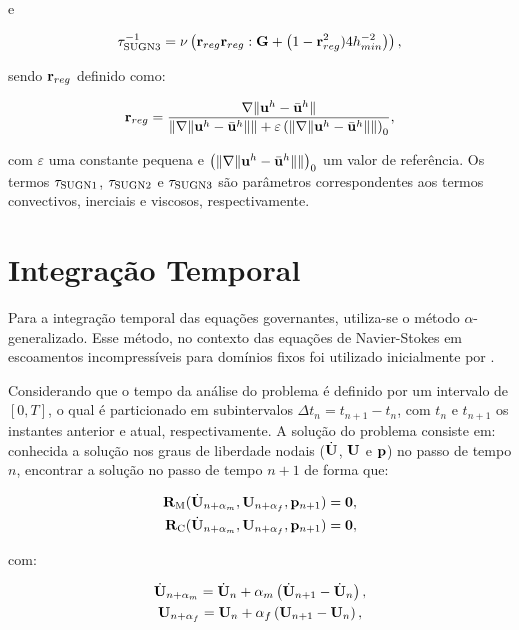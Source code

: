 \documentclass[tese_patricia]{subfiles}%
\begin{document}
\noindent e

\begin{align}
\tau_{\mathrm{SUGN3}}^{-1} = \nu \left(\mathbf{r}_{reg}\mathbf{r}_{reg} : \mathbf{G} + \left(1 - \mathbf{r}_{reg}^2)4h_{min}^{-2} \right)\right) ,
\end{align}

\noindent sendo $\mathbf{r}_{reg}$ definido como:

\begin{align}
\mathbf{r}_{reg} =\frac{\nabla \lVert\mathbf{u}^h - \bar{\mathbf{u}}^h\rVert}{\lVert \nabla \lVert\mathbf{u}^h - \bar{\mathbf{u}}^h\rVert\rVert + \varepsilon\left(\lVert \nabla \lVert\mathbf{u}^h - \bar{\mathbf{u}}^h\rVert\rVert\right)_0},
\end{align}

\noindent com $\varepsilon$ uma constante pequena e $\left(\lVert \nabla \lVert\mathbf{u}^h- \bar{\mathbf{u}}^h\rVert\rVert\right)_0$ um valor de referência. Os termos $\tau_{\mathrm{SUGN1}}$, $\tau_{\mathrm{SUGN2}}$ e $\tau_{\mathrm{SUGN3}}$ são parâmetros correspondentes aos termos convectivos, inerciais e viscosos, respectivamente.


\section{Integração Temporal}

Para a integração temporal das equações governantes, utiliza-se o método $\alpha$-generalizado. Esse método, no contexto das equações de Navier-Stokes em escoamentos incompressíveis para domínios fixos foi utilizado inicialmente por .

Considerando que o tempo da análise do problema é definido por um intervalo de $[0,T]$, o qual é particionado em subintervalos $\Delta t_{n} = t_{n+1} - t_{n}$, com $t_{n}$ e $t_{n+1}$ os instantes anterior e atual, respectivamente. A solução do problema consiste em: conhecida a solução nos graus de liberdade nodais ($\dot{\mathbf{U}}$, $\mathbf{U}$ e $\mathbf{p}$) no passo de tempo $n$, encontrar a solução no passo de tempo $n+1$ de forma que:

\begin{align}
\mathbf{R}_\mathrm{M}(\dot{\mathbf{U}}_{n+\alpha_m},\mathbf{U}_{n+\alpha_f},\mathbf{p}_{n+1}) = \mathbf{0}, \label{eq:momentum_residual_alpha}\\
\mathbf{R}_\mathrm{C}(\dot{\mathbf{U}}_{n+\alpha_m},\mathbf{U}_{n+\alpha_f},\mathbf{p}_{n+1}) = \mathbf{0}, \label{eq:continuity_residual_alpha}
\end{align}

\noindent com:

\begin{gather}
\dot{\mathbf{U}}_{n+\alpha_m} = \dot{\mathbf{U}}_n + \alpha_m \left( \dot{\mathbf{U}}_{n+1} - \dot{\mathbf{U}}_n \right), \label{eq:approx_acceleration}\\
\mathbf{U}_{n+\alpha_f} = \mathbf{U}_n + \alpha_f \left( \mathbf{U}_{n+1} - \mathbf{U}_n \right), \label{eq:approx_velocity}
\end{gather}
\end{document}
